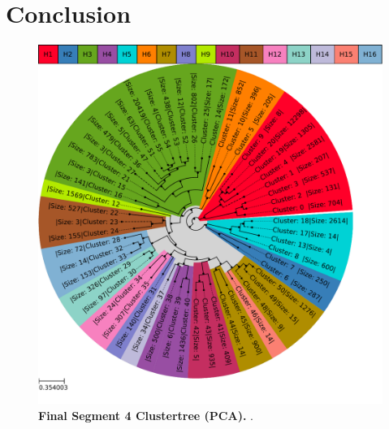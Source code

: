 \chapter{Conclusion} \label{chap:Conclusion}

\blindtext


\begin{figure}[!hbt]
    \centering
    \includegraphics[width=\textwidth]{Results/Clustertree_Segment_4.pdf}
    \caption[Final Segment 4 Clustertree (\Acrshort{PCA})]{\textbf{Final Segment 4 Clustertree (\Acrshort{PCA}).} .}
    \label{fig:PCA_Clusteree_Final}
\end{figure}